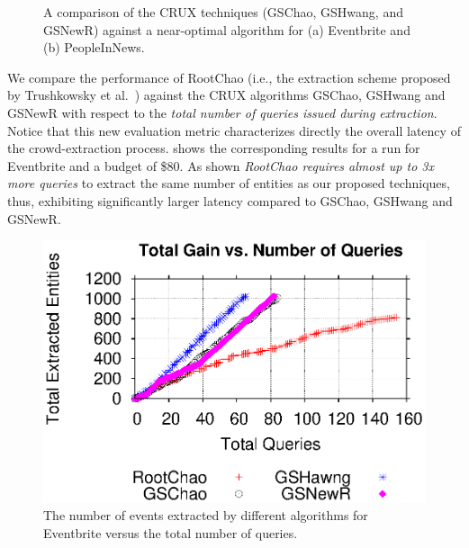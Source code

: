 \begin{figure}[h]
\begin{center}
\end{center}
\vspace{-5pt}
\caption{A comparison of the CRUX techniques (GSChao, GSHwang, and GSNewR) against a near-optimal algorithm for (a) Eventbrite and (b) PeopleInNews.}
\label{fig:resultsextr}
\vspace{-10pt}
\end{figure}

\vspace{3pt}
We compare the performance of RootChao (i.e., the extraction scheme proposed by Trushkowsky et al.~\cite{trushkowsky:2013}) against the CRUX algorithms GSChao, GSHwang and GSNewR with respect to the {\em total number of queries issued during extraction}. Notice that this new evaluation metric characterizes directly the overall latency of the crowd-extraction process.  shows the corresponding results for a run for Eventbrite and a budget of \$80. As shown {\em RootChao requires almost up to 3x more queries} to extract the same number of entities as our proposed techniques, thus, exhibiting significantly larger latency compared to GSChao, GSHwang and GSNewR.

\begin{figure}[h]
	\begin{center}
	\vspace{-10pt}
	\includegraphics[clip,scale=0.5]{figs/gain_rounds.eps}
	\caption{The number of events extracted by different algorithms for Eventbrite versus the total number of queries.}
	\label{fig:rounds}
	\end{center}
	\vspace{-20pt}
\end{figure}

